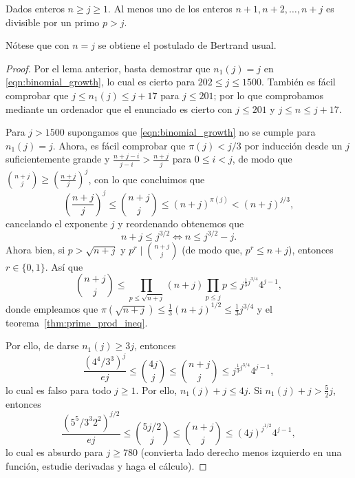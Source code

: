 \documentclass[teoria-numeros.tex]{subfiles}
\begin{document}
\begin{thm}
	Dados enteros $n \ge j \ge 1$.
	Al menos uno de los enteros $n + 1, n + 2, \dots, n + j$ es divisible por un primo $p > j$.
\end{thm}
Nótese que con $n = j$ se obtiene el postulado de Bertrand usual.
\begin{proof}
	Por el lema anterior, basta demostrar que $n_1(j) = j$ en \eqref{eqn:binomial_growth}, lo cual es cierto para $202 \le j \le 1500$.
	También es fácil comprobar que $j \le n_1(j) \le j + 17$ para $j \le 201$; por lo que comprobamos mediante un ordenador que el enunciado
	es cierto con $j \le 201$ y $j \le n \le j + 17$.

	Para $j > 1500$ supongamos que \eqref{eqn:binomial_growth} no se cumple para $n_1(j) = j$.
	Ahora, es fácil comprobar que $\pi(j) < j/3$ por inducción desde un $j$ suficientemente grande y $\frac{n + j - i}{j - i} > \frac{n + j}{j}$
	para $0 \le i < j$, de modo que $\binom{n+j}{j} \ge \left( \frac{n+j}{j} \right)^j$, con lo que concluimos que
	$$ \left( \frac{n + j}{j} \right)^j \le \binom{n + j}{j} \le (n + j)^{\pi(j)} < (n + j)^{j/3}, $$
	cancelando el exponente $j$ y reordenando obtenemos que
	$$ n + j \le j^{3/2} \iff n \le j^{3/2} - j. $$
	Ahora bien, si $p > \sqrt{n + j}$ y $p^r \mid \binom{n + j}{j}$ (de modo que, $p^r \le n + j$), entonces $r \in \{ 0, 1 \}$.
	Así que
	$$ \binom{n + j}{j} \le \prod_{p \le \sqrt{n+j}} (n + j) \prod_{p \le j} p \le j^{ \frac{1}{3}j^{3/4} } 4^{j-1}, $$
	donde empleamos que $\pi( \sqrt{n+j} ) \le \frac{1}{3} (n+j)^{1/2} \le \frac{1}{3} j^{3/4}$ y el teorema~\ref{thm:prime_prod_ineq}.

	Por ello, de darse $n_1(j) \ge 3j$, entonces
	$$ \frac{(4^4/3^3)^j}{ej} \le \binom{4j}{j} \le \binom{n + j}{j} \le j^{ \frac{1}{3}j^{3/4} } 4^{j-1}, $$
	lo cual es falso para todo $j \ge 1$.
	Por ello, $n_1(j) + j \le 4j$.
	Si $n_1(j) + j > \frac{5}{2}j$, entonces
	$$ \frac{(5^5/3^3 2^2)^{j/2}}{ej} \le \binom{5j/2}{j} \le \binom{n+j}{j} \le (4j)^{j^{1/2}} 4^{j-1}, $$
	lo cual es absurdo para $j \ge 780$ (convierta lado derecho menos izquierdo en una función, estudie derivadas y haga el cálculo).

	
\end{proof}
\end{document}

